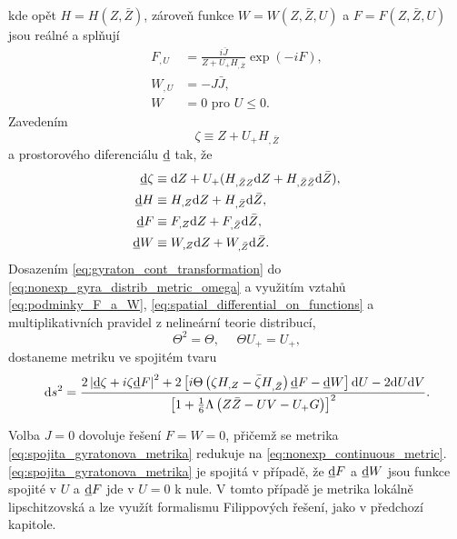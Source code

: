 kde opět $H = H(Z, \bar{Z})$, zároveň funkce $W = W(Z, \bar{Z}, U)$ a $F = F(Z, \bar{Z}, U)$ jsou reálné a splňují
\begin{equation}
    \label{eq:podminky_F_a_W}
    \begin{split}
        F_{,U} &= \frac{i\bar{J}}{Z + U_{+}H_{,\bar{Z}}} \exp{\left(-iF\right)}, \\
        W_{,U} &= -J \bar{J}, \\
        W &= 0 \text{ pro } U \leq 0.
    \end{split}
\end{equation}
Zavedením
\begin{equation}
    \zeta \equiv Z + U_{+} H_{,\bar{Z}}
\end{equation}
a prostorového diferenciálu $\underline{\mathrm{d}}$ tak, že
\begin{equation}
    \label{eq:spatial_differential_on_functions}
    \begin{split}
        \underline{\mathrm{d}}\zeta &\equiv \mathrm{d} Z + U_{+}(H_{,\bar{Z}Z}\mathrm{d} Z + H_{,\bar{Z}\bar{Z}}\mathrm{d} \bar{Z}), \\
        \underline{\mathrm{d}}H &\equiv H_{,Z}\mathrm{d} Z + H_{,\bar{Z}}\mathrm{d} \bar{Z}, \\
        \underline{\mathrm{d}}F &\equiv F_{,Z}\mathrm{d} Z + F_{,\bar{Z}}\mathrm{d} \bar{Z}, \\
        \underline{\mathrm{d}}W &\equiv W_{,Z}\mathrm{d} Z + W_{,\bar{Z}}\mathrm{d} \bar{Z}.
    \end{split}
\end{equation}
Dosazením \eqref{eq:gyraton_cont_transformation} do \eqref{eq:nonexp_gyra_distrib_metric_omega} a využitím vztahů \eqref{eq:podminky_F_a_W},
\eqref{eq:spatial_differential_on_functions} a multiplikativních pravidel z nelineární teorie distribucí,
\begin{equation}
    \Theta^2 = \Theta, ~~~~~~ \Theta U_{+} = U_{+},
\end{equation}
dostaneme metriku ve spojitém tvaru
\begin{equation}
    \label{eq:spojita_gyratonova_metrika}
    \mathrm{d} s^2 = \frac{2 \left|\underline{\mathrm{d}} \zeta + i \zeta \underline{\mathrm{d}}F\right|^2 + 2 \left[i \Theta\left(\zeta H_{,Z} - \bar{\zeta} H_{,\bar{Z}}\right) \underline{\mathrm{d}}F - \underline{\mathrm{d}}W\right] \mathrm{d} U - 2\mathrm{d} U \mathrm{d} V}{\left[1+\frac{1}{6}\Lambda\left(Z \bar{Z} - UV - U_{+}G\right)\right]^2}.
\end{equation}

Volba $J=0$ dovoluje řešení $F = W = 0$, přičemž se metrika \eqref{eq:spojita_gyratonova_metrika} redukuje na \eqref{eq:nonexp_continuous_metric}.
\eqref{eq:spojita_gyratonova_metrika} je spojitá v případě, že $\underline{\mathrm{d}}F$ a $\underline{\mathrm{d}}W$ jsou funkce spojité v $U$ a $\underline{\mathrm{d}}F$
jde v $U=0$ k nule. V tomto případě je metrika lokálně lipschitzovská a lze využít formalismu Filippových řešení, jako v předchozí kapitole.


